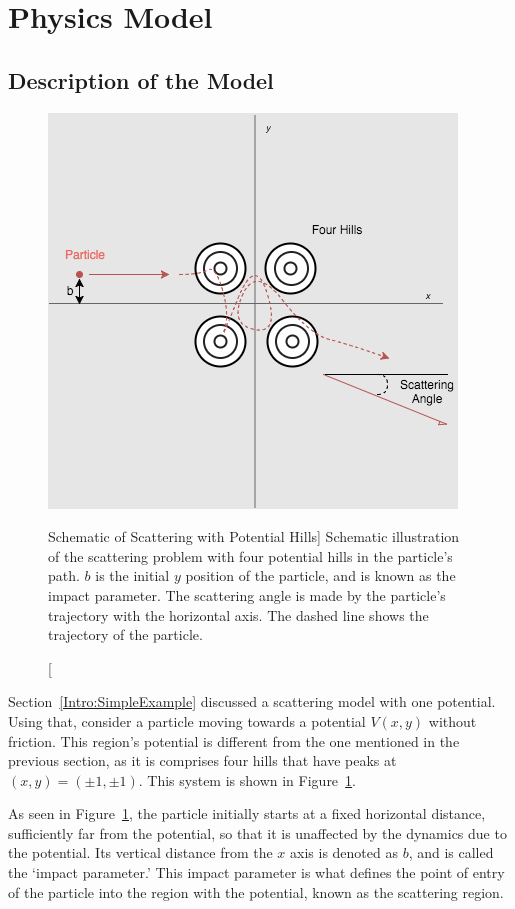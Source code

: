 \documentclass[12pt]{article} %
\begin{document}
\section{Physics Model} \label{sec2:PhysicsModel}



\subsection{Description of the Model} %


\begin{figure}[H]
	\begin{center}
		\includegraphics[width=0.5\linewidth]{scattering4HillSchem}
		\caption
		[Schematic of Scattering with Potential Hills]
		{Schematic illustration of the scattering problem with four potential hills in the particle's path. $b$ is the initial $y$ position of the particle, and is known as the impact parameter. The scattering angle is made by the particle's trajectory with the horizontal axis. The dashed line shows the trajectory of the particle.}
		\label{SchemOfScattering}
	\end{center}
\end{figure}


Section~\ref{Intro:SimpleExample} discussed a scattering model with one potential. Using that, consider a particle moving towards a potential $V(x,y)$ without friction. This region's potential is different from the one mentioned in the previous section, as it is comprises four hills that have peaks at $(x,y) = (\pm 1, \pm 1)$. This system is shown in Figure~\ref{SchemOfScattering}. 

 As seen in Figure~\ref{SchemOfScattering}, the particle initially starts at a fixed horizontal distance, sufficiently far from the potential, so that it is unaffected by the dynamics due to the potential. Its vertical distance from the $x$ axis is denoted as $b$, and is called the `impact parameter.' This impact parameter is what defines the point of entry of the particle into the region with the potential, known as the scattering region. \\
 
\end{document}
